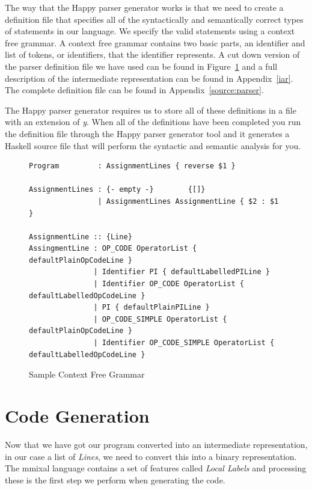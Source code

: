 \documentclass[a4paper,11pt]{report}
\begin{document}
The way that the Happy parser generator works is that we need to create a definition file that specifies all of the syntactically and semantically correct types of statements in our language. We specify the valid statements using a context free grammar. A context free grammar contains two basic parts, an identifier and list of tokens, or identifiers, that the identifier represents. A cut down version of the parser definition file we have used can be found in Figure~\ref{cfg:happy} and a full description of the intermediate representation can be found in Appendix~\ref{iar}. 
The complete definition file can be found in Appendix~\ref{source:parser}.

\clearpage
The Happy parser generator requires us to store all of these definitions in a file with an extension of \textit{y}. When all of the definitions have been completed you run the definition file through the Happy parser generator tool and it generates a Haskell source file that will perform the syntactic and semantic analysis for you.

\begin{figure}[ht!]
\centering
\begin{lstlisting}[basicstyle=\ttfamily\tiny]
Program         : AssignmentLines { reverse $1 }

AssignmentLines : {- empty -}        {[]}
                | AssignmentLines AssignmentLine { $2 : $1 }

AssignmentLine :: {Line}
AssingmentLine : OP_CODE OperatorList { defaultPlainOpCodeLine }
               | Identifier PI { defaultLabelledPILine }
               | Identifier OP_CODE OperatorList { defaultLabelledOpCodeLine }
               | PI { defaultPlainPILine }
               | OP_CODE_SIMPLE OperatorList { defaultPlainOpCodeLine }
               | Identifier OP_CODE_SIMPLE OperatorList { defaultLabelledOpCodeLine }
\end{lstlisting}
\caption{Sample Context Free Grammar}
\label{cfg:happy}
\end{figure}

\section{Code Generation}
Now that we have got our program converted into an intermediate representation, in our case a list of \textit{Lines}, we need to convert this into a binary representation. The mmixal language contains a set of features called \textit{Local Labels} and processing these is the first step we perform when generating the code.
\end{document}
